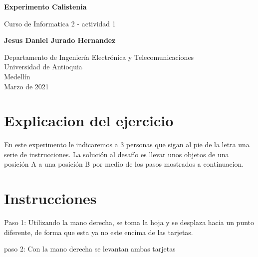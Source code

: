 \documentclass{article}
\begin{document}
\begin{titlepage}
    \begin{center}
        \vspace*{1cm}
            
        \Huge
        \textbf{Experimento Calistenia}
            
        \vspace{0.5cm}
        \LARGE
        Curso de Informatica 2 - actividad 1
            
        \vspace{1.5cm}
            
        \textbf{Jesus Daniel Jurado Hernandez}
            
        \vfill
            
        \vspace{0.8cm}
            
        \Large
        Departamento de Ingeniería Electrónica y Telecomunicaciones\\
        Universidad de Antioquia\\
        Medellín\\
        Marzo de 2021
            
    \end{center}
\end{titlepage}

\tableofcontents
\newpage
\section{Explicacion del ejercicio}\label{intro}
En este experimento le indicaremos a 3 personas que sigan al pie de la letra una serie de instrucciones. La solución al desafío es llevar unos objetos de una posición A a una posición B por medio de los pasos mostrados a continuacion.

\section{Instrucciones} \label{contenido}

Paso 1: Utilizando la mano derecha, se toma la hoja y se desplaza hacia un punto diferente, de forma que esta ya no este encima de las tarjetas.

\vspace{0.5cm}

paso 2: Con la mano derecha se levantan ambas tarjetas

\vspace{0.5cm}
\end{document}
